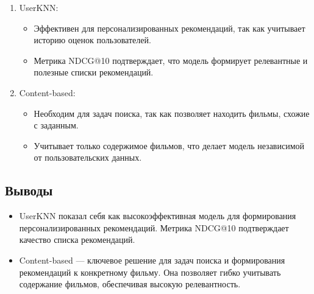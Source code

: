 \begin{enumerate}
\def\labelenumi{\arabic{enumi}.}
\tightlist
\item
  UserKNN:

  \begin{itemize}
  \tightlist
  \item
    Эффективен для персонализированных рекомендаций, так как учитывает
    историю оценок пользователей.
  \item
    Метрика NDCG@10 подтверждает, что модель формирует релевантные и
    полезные списки рекомендаций.
  \end{itemize}
\item
  Content-based:

  \begin{itemize}
  \tightlist
  \item
    Необходим для задач поиска, так как позволяет находить фильмы,
    схожие с заданным.
  \item
    Учитывает только содержимое фильмов, что делает модель независимой
    от пользовательских данных.
  \end{itemize}
\end{enumerate}

\hypertarget{ux432ux44bux432ux43eux434ux44b}{%
\subsection*{Выводы}\label{ux432ux44bux432ux43eux434ux44b}}

\begin{itemize}
\tightlist
\item
  UserKNN показал себя как высокоэффективная модель для
  формирования персонализированных рекомендаций. Метрика NDCG@10
  подтверждает качество списка рекомендаций.
\item
  Content-based --- ключевое решение для задач поиска и
  формирования рекомендаций к конкретному фильму. Она позволяет гибко
  учитывать содержание фильмов, обеспечивая высокую релевантность.
\end{itemize}

\endinput